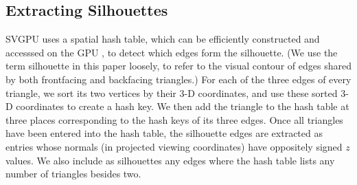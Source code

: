 \documentclass[review]{acmsiggraph}
\begin{document}
\subsection{Extracting Silhouettes}
SVGPU uses a spatial hash table, which can be efficiently constructed and
accesssed on the GPU \cite{lefebvre2006}, to detect which edges form the
silhouette. (We use the term silhouette in this paper loosely, to refer to the
visual contour of edges shared by both frontfacing and backfacing triangles.)
For each of the three edges of
every triangle, we sort its two vertices by their 3-D coordinates, and use
these sorted 3-D coordinates to create a hash key. We then add the triangle to
the hash table at three places corresponding to the hash keys of its three
edges. Once all triangles have been entered into the hash table, the silhouette
edges are extracted as entries whose normals (in projected viewing coordinates)
have oppositely signed $z$ values. We also include as silhouettes any edges
where the hash table lists any number of triangles besides two.


\end{document}
